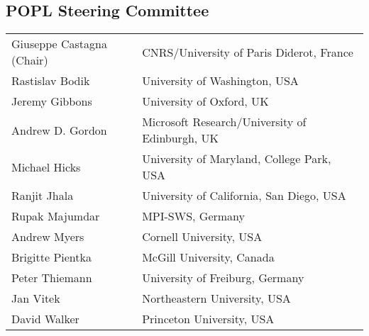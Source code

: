 \subsection*{\sffamily POPL Steering Committee}

\begin{tabular}{@{}p{\namewidth}l@{}}
Giuseppe Castagna (Chair)
  & CNRS/University of Paris Diderot, France \\
Rastislav Bodik
  & University of Washington, USA \\
Jeremy Gibbons
  & University of Oxford, UK \\
Andrew D. Gordon
  & Microsoft Research/University of Edinburgh, UK \\
Michael Hicks
  & University of Maryland, College Park, USA \\
Ranjit Jhala
  & University of California, San Diego, USA \\
Rupak Majumdar
  & MPI-SWS, Germany \\
Andrew Myers
  & Cornell University, USA \\
Brigitte Pientka
  & McGill University, Canada \\
Peter Thiemann
  & University of Freiburg, Germany \\
Jan Vitek
  & Northeastern University, USA \\
David Walker
  & Princeton University, USA \\
\end{tabular}


\newpage
